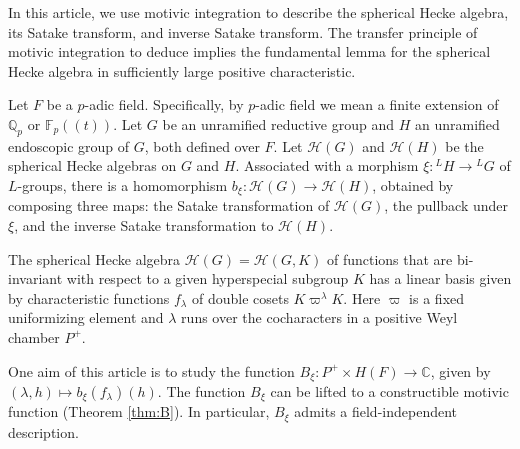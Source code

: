 
% 
% 


\newcommand{\XX}[1]{{\it  [To do: #1]}}
\newcommand{\ring}[1]{\mathbb{#1}}
\newcommand{\g}[1]{\langle{#1}\rangle}
\def\op#1{{\operatorname{#1}}}
\def\inv{\op{inv}}
\def\dom{P^+}
\def\Q{{\ring{Q}}}
\def\card{\op{card}}

\def\C{\mathcal C}
\def\N{\mathcal N}
\def\H{\mathcal H}
\def\M{\mathcal M}
\def\T{\mathcal T}

\def\n{{\mathfrak n}}


\def\libel#1{{\text{\sc [#1]~}}\label{#1}}
\def\rif#1{(\ref{#1}-{\text{\sc #1})}}


\libel{XX} %

In this article, we use motivic integration to describe the spherical
Hecke algebra, its Satake transform, and inverse Satake transform.
The transfer principle of motivic integration to deduce implies the fundamental
lemma for the spherical Hecke algebra in sufficiently large positive characteristic.

Let $F$ be a $p$-adic field.  Specifically, 
by $p$-adic field we mean a finite extension of $\ring{Q}_p$ or $\ring{F}_p((t))$.
Let $G$ be an unramified reductive group and $H$ an unramified endoscopic group of $G$, both defined over $F$.
Let $\H(G)$ and $\H(H)$ be the spherical Hecke algebras on $G$ and $H$.
Associated with  a morphism $\xi:{}^LH\to {}^LG$ of $L$-groups, there is a homomorphism
$b_\xi:\H(G)\to \H(H)$, obtained by composing three maps: the Satake transformation of $\H(G)$,
the pullback under $\xi$, and the inverse Satake transformation to $\H(H)$.

The spherical Hecke algebra $\H(G)=\H(G,K)$ of functions that are bi-invariant with respect
to a given hyperspecial subgroup $K$ has a linear basis given by characteristic functions $f_\lambda$
of double cosets $K\varpi^\lambda K$.  Here $\varpi$ is a fixed uniformizing element and $\lambda$
runs over the cocharacters in a positive Weyl chamber $P^+$.

One aim of this article is to study the function $B_\xi:P^+\times H(F)\to \ring{C}$, given by
$(\lambda,h)\mapsto b_\xi(f_\lambda)(h)$.   The function $B_\xi$ can be lifted to a constructible motivic
function (Theorem \ref{thm:B}).   In particular, $B_\xi$ admits a field-independent description.  

